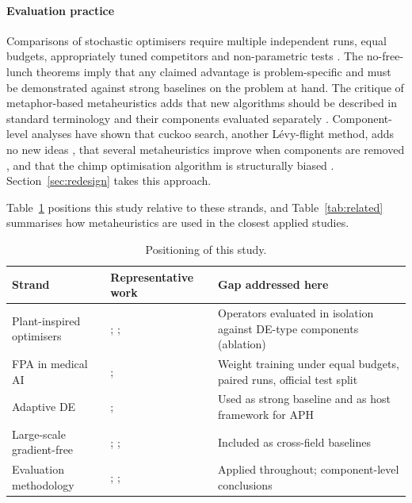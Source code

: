 \documentclass[10pt,letterpaper]{article}
\begin{document}
\paragraph{Evaluation practice} Comparisons of stochastic optimisers require multiple independent runs, equal budgets, appropriately tuned competitors and non-parametric tests \citep{derrac2011tutorial,demsar2006,eiben2011parameter}. The no-free-lunch theorems \citep{wolpert1997nfl} imply that any claimed advantage is problem-specific and must be demonstrated against strong baselines on the problem at hand. The critique of metaphor-based metaheuristics \citep{sorensen2015metaphor,camacho2023exposing} adds that new algorithms should be described in standard terminology and their components evaluated separately \citep{lones2020metaphors}. Component-level analyses have shown that cuckoo search, another Lévy-flight method, adds no new ideas \citep{camacho2022cuckoo}, that several metaheuristics improve when components are removed \citep{piotrowski2018simplified}, and that the chimp optimisation algorithm is structurally biased \citep{deng2024chimp}. Section~\ref{sec:redesign} takes this approach.

Table~\ref{tab:taxonomy} positions this study relative to these strands, and Table~\ref{tab:related} summarises how metaheuristics are used in the closest applied studies.

\begin{table}[!t]
\centering
\caption{Positioning of this study.}
\label{tab:taxonomy}
\footnotesize
\begin{tabular}{p{3.0cm}p{3.6cm}p{5.2cm}}
\toprule
Strand & Representative work & Gap addressed here \\
\midrule
Plant-inspired optimisers & \citet{yang2012fpa}; \citet{abdelbasset2019fpareview}; \citet{sulaiman2015sbppa} & Operators evaluated in isolation against DE-type components (ablation) \\
FPA in medical AI & \citet{zhou2025fpaensemble}; \citet{kaya2024fpaanfis} & Weight training under equal budgets, paired runs, official test split \\
Adaptive DE & \citet{zhang2009jade}; \citet{tanabe2013shade,tanabe2014lshade} & Used as strong baseline and as host framework for APH \\
Large-scale gradient-free & \citet{salimans2017es}; \citet{malladi2023mezo}; \citet{qiu2025esllm} & Included as cross-field baselines \\
Evaluation methodology & \citet{derrac2011tutorial}; \citet{demsar2006}; \citet{sorensen2015metaphor} & Applied throughout; component-level conclusions \\
\bottomrule
\end{tabular}
\end{table}
\end{document}
